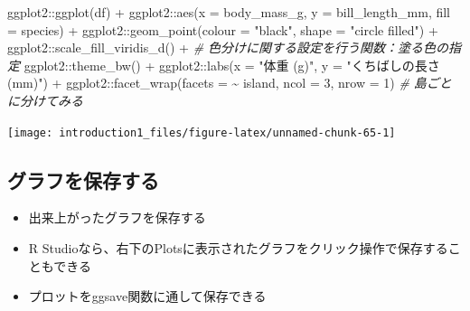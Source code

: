 \documentclass[
]{ltjsarticle}
\newenvironment{Shaded}{\begin{snugshade}}{\end{snugshade}}
\newcommand{\AttributeTok}[1]{\textcolor[rgb]{0.77,0.63,0.00}{#1}}
\newcommand{\CommentTok}[1]{\textcolor[rgb]{0.56,0.35,0.01}{\textit{#1}}}
\newcommand{\DecValTok}[1]{\textcolor[rgb]{0.00,0.00,0.81}{#1}}
\newcommand{\FunctionTok}[1]{\textcolor[rgb]{0.00,0.00,0.00}{#1}}
\newcommand{\NormalTok}[1]{#1}
\newcommand{\SpecialCharTok}[1]{\textcolor[rgb]{0.00,0.00,0.00}{#1}}
\newcommand{\StringTok}[1]{\textcolor[rgb]{0.31,0.60,0.02}{#1}}
\providecommand{\tightlist}{%
  \setlength{\itemsep}{0pt}\setlength{\parskip}{0pt}}
\begin{document}
\begin{Shaded}
\begin{Highlighting}[]
\NormalTok{ggplot2}\SpecialCharTok{::}\FunctionTok{ggplot}\NormalTok{(df) }\SpecialCharTok{+}
\NormalTok{  ggplot2}\SpecialCharTok{::}\FunctionTok{aes}\NormalTok{(}\AttributeTok{x =}\NormalTok{ body\_mass\_g, }\AttributeTok{y =}\NormalTok{ bill\_length\_mm, }\AttributeTok{fill =}\NormalTok{ species) }\SpecialCharTok{+}
\NormalTok{  ggplot2}\SpecialCharTok{::}\FunctionTok{geom\_point}\NormalTok{(}\AttributeTok{colour =} \StringTok{"black"}\NormalTok{, }\AttributeTok{shape =} \StringTok{"circle filled"}\NormalTok{) }\SpecialCharTok{+}
\NormalTok{  ggplot2}\SpecialCharTok{::}\FunctionTok{scale\_fill\_viridis\_d}\NormalTok{() }\SpecialCharTok{+} \CommentTok{\# 色分けに関する設定を行う関数：塗る色の指定}
\NormalTok{  ggplot2}\SpecialCharTok{::}\FunctionTok{theme\_bw}\NormalTok{() }\SpecialCharTok{+}
\NormalTok{  ggplot2}\SpecialCharTok{::}\FunctionTok{labs}\NormalTok{(}\AttributeTok{x =} \StringTok{"体重 (g)"}\NormalTok{, }\AttributeTok{y =} \StringTok{"くちばしの長さ (mm)"}\NormalTok{) }\SpecialCharTok{+}
\NormalTok{  ggplot2}\SpecialCharTok{::}\FunctionTok{facet\_wrap}\NormalTok{(}\AttributeTok{facets =} \SpecialCharTok{\textasciitilde{}}\NormalTok{ island, }\AttributeTok{ncol =} \DecValTok{3}\NormalTok{, }\AttributeTok{nrow =} \DecValTok{1}\NormalTok{) }\CommentTok{\# 島ごとに分けてみる}
\end{Highlighting}
\end{Shaded}

\begin{center}\texttt{[image: introduction1\_files/figure-latex/unnamed-chunk-65-1]} \end{center}

\hypertarget{ux30b0ux30e9ux30d5ux3092ux4fddux5b58ux3059ux308b}{%
\subsection{グラフを保存する}\label{ux30b0ux30e9ux30d5ux3092ux4fddux5b58ux3059ux308b}}

\begin{itemize}
\tightlist
\item
  出来上がったグラフを保存する
\item
  R
  Studioなら、右下のPlotsに表示されたグラフをクリック操作で保存することもできる
\item
  プロットをggsave関数に通して保存できる
\end{itemize}
\end{document}
